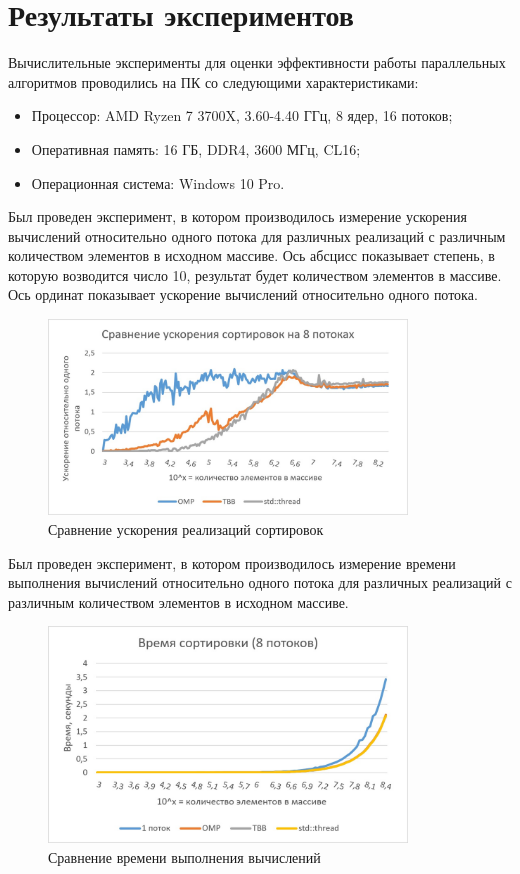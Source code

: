 \documentclass{report}
\begin{document}
\section*{Результаты экспериментов}
Вычислительные эксперименты для оценки эффективности работы параллельных алгоритмов проводились на ПК со следующими характеристиками:
\begin{itemize}
    \item Процессор: AMD Ryzen 7 3700X, 3.60-4.40 ГГц, 8 ядер, 16 потоков;
    \item Оперативная память: 16 ГБ, DDR4, 3600 МГц, CL16;
    \item Операционная система: Windows 10 Pro.
\end{itemize}
\par Был проведен эксперимент, в котором производилось измерение ускорения вычислений относительно одного потока для различных реализаций с различным количеством элементов в исходном массиве. Ось абсцисс показывает степень, в которую возводится число 10, результат будет количеством элементов в массиве. Ось ординат показывает ускорение вычислений относительно одного потока.
\begin{figure}[H]
    \centering
    \includegraphics[width=0.85\textwidth]{../modules/task_1/ivanov_arkady_rbms/images/boost_comparsion_8thrd.jpg}
    \caption{Сравнение ускорения реализаций сортировок}
    \label{fig:my_label_1}
\end{figure}
\par Был проведен эксперимент, в котором производилось измерение времени выполнения вычислений относительно одного потока для различных реализаций с различным количеством элементов в исходном массиве.
\begin{figure}[H]
    \centering
    \includegraphics[width=0.85\textwidth]{../modules/task_1/ivanov_arkady_rbms/images/sort_time_8thrd.jpg}
    \caption{Сравнение времени выполнения вычислений}
    \label{fig:my_label_2}
\end{figure}
\end{document}
